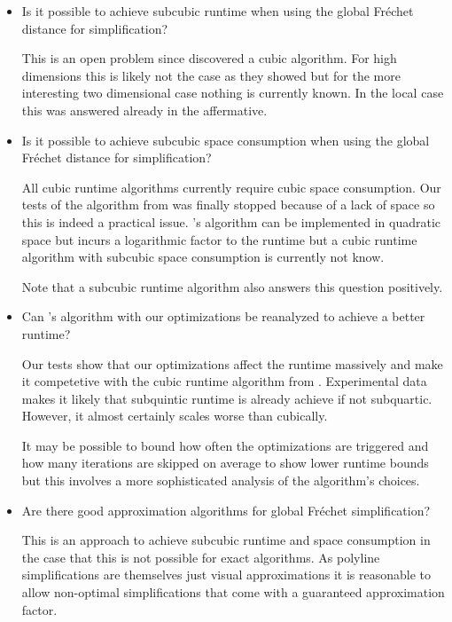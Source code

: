 \begin{itemize}
  \item Is it possible to achieve subcubic runtime when using the global Fréchet distance for simplification?

	This is an open problem since \citeauthor{polyline_simplification_has_cubic_complexity_bringmannetal} discovered a cubic algorithm. For high dimensions this is likely not the case as they showed but for the more interesting two dimensional case nothing is currently known. In the local case this was answered already in the affermative.

	\item Is it possible to achieve subcubic space consumption when using the global Fréchet distance for simplification?

	All cubic runtime algorithms currently require cubic space consumption. Our tests of the algorithm from \citeauthor{polyline_simplification_has_cubic_complexity_bringmannetal} was finally stopped because of a lack of space so this is indeed a practical issue. \citeauthor{global_curve_simplification}'s algorithm can be implemented in quadratic space but incurs a logarithmic factor to the runtime but a cubic runtime algorithm with subcubic space consumption is currently not know.

	Note that a subcubic runtime algorithm also answers this question positively.

	\item Can \citeauthor{on_optimal_polyline_simplification_using_the_hausdorff_and_frechet_distance}'s algorithm with our optimizations be reanalyzed to achieve a better runtime? 

	Our tests show that our optimizations affect the runtime massively and make it competetive with the cubic runtime algorithm from \citeauthor{polyline_simplification_has_cubic_complexity_bringmannetal}. Experimental data makes it likely that subquintic runtime is already achieve if not subquartic. However, it almost certainly scales worse than cubically. 

	It may be possible to bound how often the optimizations are triggered and how many iterations are skipped on average to show lower runtime bounds but this involves a more sophisticated analysis of the algorithm's choices.

	\item Are there good approximation algorithms for global Fréchet simplification?

	This is an approach to achieve subcubic runtime and space consumption in the case that this is not possible for exact algorithms. As polyline simplifications are themselves just visual approximations it is reasonable to allow non-optimal simplifications that come with a guaranteed approximation factor.


\end{itemize}
